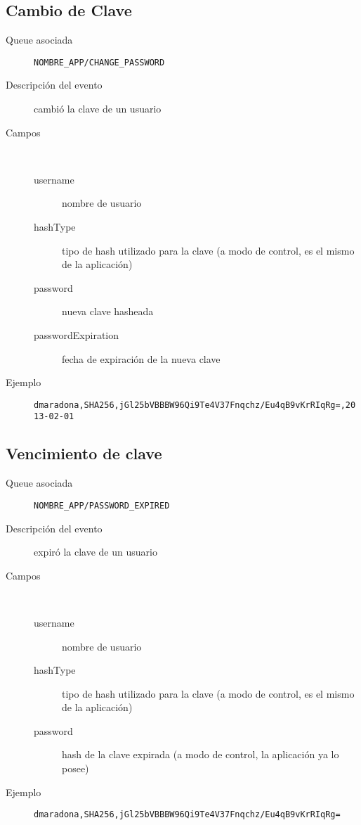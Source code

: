 \subsection{Cambio de Clave}
\begin{description}
  \item[Queue asociada] \texttt{NOMBRE\_APP/CHANGE\_PASSWORD}
  \item[Descripción del evento] cambió la clave de un usuario
  \item[Campos] \ 
    \begin{description}
      \item[username] nombre de usuario
      \item[hashType] tipo de hash utilizado para la clave (a modo de control, es el mismo de la aplicación)
      \item[password] nueva clave hasheada
      \item[passwordExpiration] fecha de expiración de la nueva clave
    \end{description}
  \item[Ejemplo] \texttt{dmaradona,SHA256,jGl25bVBBBW96Qi9Te4V37Fnqchz/Eu4qB9vKrRIqRg=,2013-02-01}
\end{description}

\subsection{Vencimiento de clave}
\begin{description}
  \item[Queue asociada] \texttt{NOMBRE\_APP/PASSWORD\_EXPIRED}
  \item[Descripción del evento] expiró la clave de un usuario
  \item[Campos] \ 
    \begin{description}
      \item[username] nombre de usuario
      \item[hashType] tipo de hash utilizado para la clave (a modo de control, es el mismo de la aplicación)
      \item[password] hash de la clave expirada (a modo de control, la aplicación ya lo posee)
    \end{description}
  \item[Ejemplo] \texttt{dmaradona,SHA256,jGl25bVBBBW96Qi9Te4V37Fnqchz/Eu4qB9vKrRIqRg=}
\end{description}


